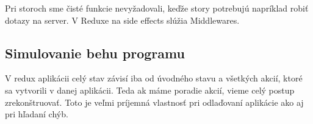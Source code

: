 Pri storoch sme čisté funkcie nevyžadovali, keďže story potrebujú napríklad robiť dotazy na server. V Reduxe na side effects slúžia Middlewares.

\subsection{Simulovanie behu programu}
V redux aplikácii celý stav závisí iba od úvodného stavu a všetkých akcií, ktoré sa vytvorili v danej aplikácii. Teda ak máme poradie akcií, vieme celý postup zrekonštruovať. Toto je veľmi príjemná vlastnosť pri odlaďovaní aplikácie ako aj pri hľadaní chýb.
